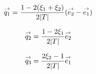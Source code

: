     \begin{minipage}{\textwidth}
      \begin{minipage}{0.329\textwidth}
          \begin{center}
            \begin{tikzpicture}[scale=1]
              
            \end{tikzpicture}
          \end{center}
          \begin{equation*}
            \vect{q_1}=\frac{1-2(\xi_1+\xi_2)}{2|T|}(\vect{e_2}-\vect{e_1})
          \end{equation*}
      \end{minipage}
      \begin{minipage}{0.329\textwidth}
          \begin{center}
            \begin{tikzpicture}[scale=1]
              
            \end{tikzpicture}
             \begin{equation*}
              \vect{q_2}=\frac{1-2\xi_1}{2|T|}\vect{e_2}
            \end{equation*}
          \end{center}
      \end{minipage}
      \begin{minipage}{0.329\textwidth}
          \begin{center}
            \begin{tikzpicture}[scale=1]
              
            \end{tikzpicture}
            \begin{equation*}
              \vect{q_3}=\frac{2\xi_2-1}{2|T|}\vect{e_1}
            \end{equation*}
          \end{center}
      \end{minipage}
      \label{fig:form_int:fon_base:q}
    \end{minipage}

